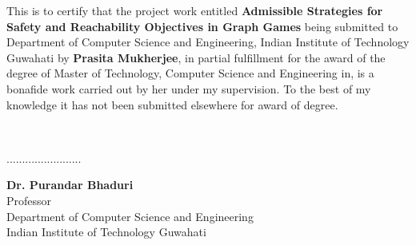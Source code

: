 \begin {Certificate}
\begin{large}
This is to certify that the project work entitled \textbf{Admissible Strategies for Safety and Reachability Objectives in Graph Games} being submitted to Department of Computer Science and Engineering, Indian Institute of Technology Guwahati by \textbf{Prasita Mukherjee}, in partial fulfillment for the award of the degree of Master of Technology, Computer Science and Engineering in, is a bonafide work carried out by her under my supervision. To the best of my knowledge it has not been submitted elsewhere for award of degree.
\end{large}
\\[4cm]
\begin{flushright}

........................\par
\textbf{Dr. Purandar Bhaduri}\\
Professor\\
Department of Computer Science and Engineering\\
Indian Institute of Technology Guwahati\\

\normalfont
\end{flushright}
\end {Certificate}